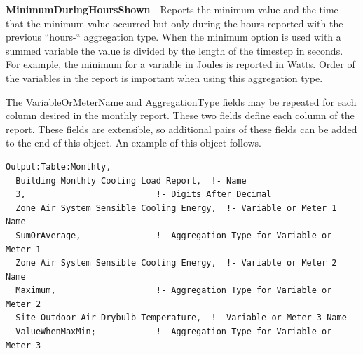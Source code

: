 \textbf{MinimumDuringHoursShown} - Reports the minimum value and the time that the minimum value occurred but only during the hours reported with the previous ``hours-`` aggregation type. When the minimum option is used with a summed variable the value is divided by the length of the timestep in seconds. For example, the minimum for a variable in Joules is reported in Watts. Order of the variables in the report is important when using this aggregation type.

The VariableOrMeterName and AggregationType fields may be repeated for each column desired in the monthly report. These two fields define each column of the report.  These fields are extensible, so additional pairs of these fields can be added to the end of this object.  An example of this object follows.

\begin{lstlisting}
Output:Table:Monthly,
  Building Monthly Cooling Load Report,  !- Name
  3,                          !- Digits After Decimal
  Zone Air System Sensible Cooling Energy,  !- Variable or Meter 1 Name
  SumOrAverage,               !- Aggregation Type for Variable or Meter 1
  Zone Air System Sensible Cooling Energy,  !- Variable or Meter 2 Name
  Maximum,                    !- Aggregation Type for Variable or Meter 2
  Site Outdoor Air Drybulb Temperature,  !- Variable or Meter 3 Name
  ValueWhenMaxMin;            !- Aggregation Type for Variable or Meter 3
\end{lstlisting}